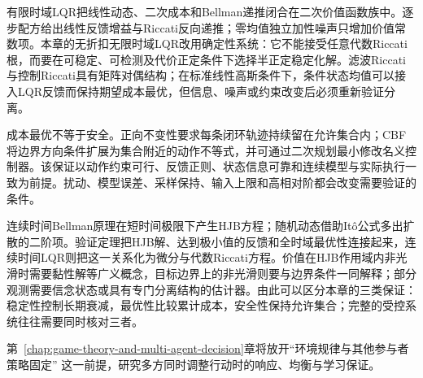 有限时域LQR把线性动态、二次成本和Bellman递推闭合在二次价值函数族中。逐步配方给出线性反馈增益与Riccati反向递推；零均值独立加性噪声只增加价值常数项。本章的无折扣无限时域LQR改用确定性系统：它不能接受任意代数Riccati根，而要在可稳定、可检测及代价正定条件下选择半正定稳定化解。滤波Riccati与控制Riccati具有矩阵对偶结构；在标准线性高斯条件下，条件状态均值可以接入LQR反馈而保持期望成本最优，但信息、噪声或约束改变后必须重新验证分离。

成本最优不等于安全。正向不变性要求每条闭环轨迹持续留在允许集合内；CBF将边界方向条件扩展为集合附近的动作不等式，并可通过二次规划最小修改名义控制器。该保证以动作约束可行、反馈正则、状态信息可靠和连续模型与实际执行一致为前提。扰动、模型误差、采样保持、输入上限和高相对阶都会改变需要验证的条件。

连续时间Bellman原理在短时间极限下产生HJB方程；随机动态借助Itô公式多出扩散的二阶项。验证定理把HJB解、达到极小值的反馈和全时域最优性连接起来，连续时间LQR则把这一关系化为微分与代数Riccati方程。价值在HJB作用域内非光滑时需要黏性解等广义概念，目标边界上的非光滑则要与边界条件一同解释；部分观测需要信念状态或具有专门分离结构的估计器。由此可以区分本章的三类保证：稳定性控制长期衰减，最优性比较累计成本，安全性保持允许集合；完整的受控系统往往需要同时核对三者。

第~\ref{chap:game-theory-and-multi-agent-decision}章将放开“环境规律与其他参与者策略固定”
这一前提，研究多方同时调整行动时的响应、均衡与学习保证。
